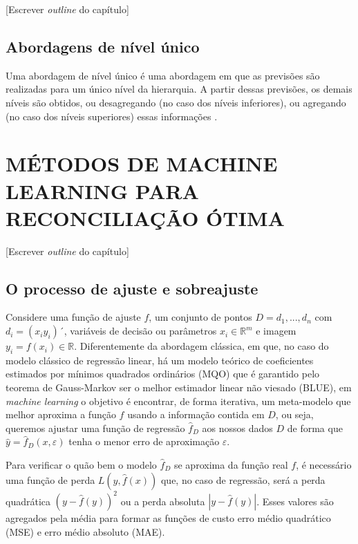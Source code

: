 \documentclass[
  12pt,
  oneside,
  a4paper,
  chapter=TITLE,
  section=TITLE,
  brazil]{abntex2}
\begin{document}
{[}Escrever \emph{outline} do capítulo{]}

\hypertarget{abordagens-de-nuxedvel-uxfanico}{%
\subsection{Abordagens de nível
único}\label{abordagens-de-nuxedvel-uxfanico}}

Uma abordagem de nível único é uma abordagem em que as previsões são
realizadas para um único nível da hierarquia. A partir dessas previsões,
os demais níveis são obtidos, ou desagregando (no caso dos níveis
inferiores), ou agregando (no caso dos níveis superiores) essas
informações \autocite{hyndman_forecasting_2021}.

\hypertarget{muxe9todos-de-machine-learning-para-reconciliauxe7uxe3o-uxf3tima}{%
\section{MÉTODOS DE MACHINE LEARNING PARA RECONCILIAÇÃO
ÓTIMA}\label{muxe9todos-de-machine-learning-para-reconciliauxe7uxe3o-uxf3tima}}

{[}Escrever \emph{outline} do capítulo{]}

\hypertarget{o-processo-de-ajuste-e-sobreajuste}{%
\subsection{O processo de ajuste e
sobreajuste}\label{o-processo-de-ajuste-e-sobreajuste}}

Considere uma função de ajuste \(f\), um conjunto de pontos
\(D = {d_1, ..., d_n}\) com \(d_i = (x_i y_i)´\), variáveis de decisão
ou parâmetros \(x_i \in \mathbb{R}^m\) e imagem
\(y_i = f(x_i) \in \mathbb{R}\). Diferentemente da abordagem clássica,
em que, no caso do modelo clássico de regressão linear, há um modelo
teórico de coeficientes estimados por mínimos quadrados ordinários (MQO)
que é garantido pelo teorema de Gauss-Markov ser o melhor estimador
linear não viesado (BLUE), em \emph{machine learning} o objetivo é
encontrar, de forma iterativa, um meta-modelo que melhor aproxima a
função \(f\) usando a informação contida em \(D\), ou seja, queremos
ajustar uma função de regressão \(\hat{f}_D\) aos nossos dados \(D\) de
forma que \(\hat{y} = \hat{f}_D(x, \varepsilon)\) tenha o menor erro de
aproximação \(\varepsilon\).

Para verificar o quão bem o modelo \(\hat{f}_D\) se aproxima da função
real \(f\), é necessário uma função de perda \(L(y, \hat{f}(x))\) que,
no caso de regressão, será a perda quadrática \((y - \hat{f}(y))^2\) ou
a perda absoluta \(|y - \hat{f}(y)|\). Esses valores são agregados pela
média para formar as funções de custo erro médio quadrático (MSE) e erro
médio absoluto (MAE).
\end{document}
